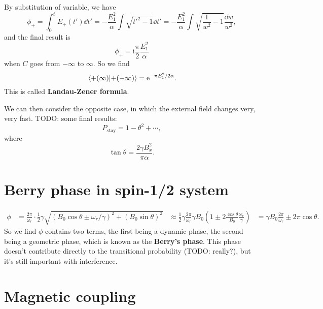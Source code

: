 \documentclass[hyperref, a4paper]{article}
\newcommand*{\ii}{\mathrm{i}}
\newcommand*{\ee}{\mathrm{e}}
\newcommand*{\concept}[1]{{\textbf{#1}}}
\def\\{}%
\begin{document}
By substitution of variable, 
we have 
\begin{equation}
    \phi_+ = \int_{0}^{t} E_+(t') \dd{t'}
    = - \frac{E_1^2}{\alpha} \int \sqrt{t'^2 - 1} \dd{t'}
    = - \frac{E_1^2}{\alpha} \int \sqrt{\frac{1}{w^2} - 1} \frac{\dd{w}}{w^2} ,
\end{equation}
and the final result is 
\begin{equation}
    \phi_+ = \ii \frac{\pi}{2} \frac{E_1^2}{\alpha}
\end{equation} 
when $C$ goes from $-\infty$ to $\infty$.
So we find 
\begin{equation}
    \braket*{+(\infty)}{+(-\infty)} = \ee^{- \pi E_1^2 / 2 \alpha}.
\end{equation}
This is called \concept{Landau-Zener formula}.

We can then consider the opposite case, 
in which the external field changes very, very fast. 
TODO: some final results: 
\begin{equation}
    P_{\text{stay}} = 1 - \theta^2 + \cdots,
\end{equation}
where 
\begin{equation}
    \tan \theta = \frac{2 \gamma B_x^2}{\pi \alpha}.
\end{equation}

\section{Berry phase in spin-1/2 system}

\begin{equation}
    \begin{aligned}
        \phi &= \frac{2\pi}{\omega_r} \cdot \frac{1}{2} \gamma \sqrt{
            (B_0 \cos \theta \pm \omega_r / \gamma)^2
            + (B_0 \sin \theta)^2
        } \\
        &\approx \frac{1}{2} \gamma \frac{2\pi}{\omega_r} \gamma B_0 
        \left( 1 \pm 2 \frac{\cos \theta}{B_0} \frac{\omega_r}{\gamma} \right) \\
        &= \gamma B_0 \frac{2\pi}{\omega_r} \pm 2 \pi \cos \theta.
    \end{aligned}
\end{equation}
So we find $\phi$ contains two terms, 
the first being a dynamic phase, 
the second being a geometric phase, 
which is known as the \concept{Berry's phase}.
This phase doesn't contribute directly to the transitional probability (TODO: really?), 
but it's still important with interference.

\section{Magnetic coupling}
\end{document}
